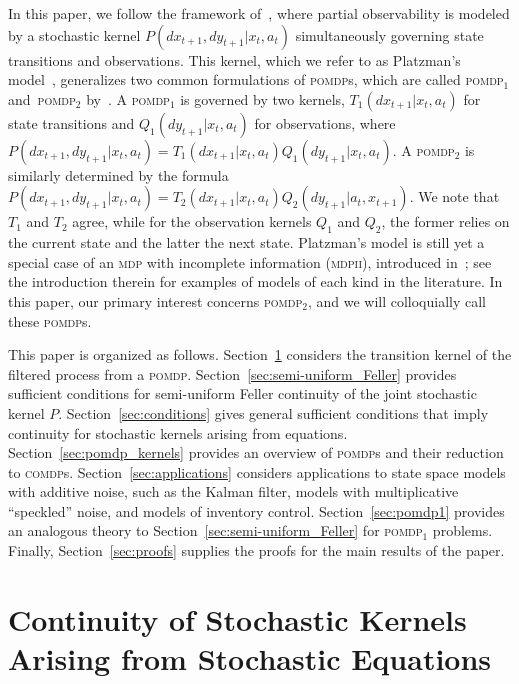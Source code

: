 \documentclass[11pt,onecolumn]{IEEEtran}  %
\newcommand{\mdp}{\textsc{mdp}}
\newcommand{\mdpii}{\textsc{mdpii}}
\newcommand{\pomdp}{\textsc{pomdp}}
\newcommand{\pomdpOne}{\pomdp{}${}_{1}$}
\newcommand{\pomdpTwo}{\pomdp{}${}_{2}$}
\newcommand{\comdp}{\textsc{comdp}}
\theoremstyle{definition}
\begin{document}
In this paper, we follow the framework of~\citet{feinberg_markov_2022}, where partial observability is modeled by a stochastic kernel $P(dx_{t+1}, dy_{t+1}|x_t,a_t)$ simultaneously governing state transitions and observations. This kernel, which we refer to as Platzman's model~\cite{platzman_1980}, generalizes two common formulations of \pomdp{}s, which are called \pomdpOne{} and~\pomdpTwo{} by~\citet{feinberg_markov_2022}. A \pomdpOne{} is governed by two kernels, $T_1(dx_{t+1}|x_t,a_t)$ for state transitions and $Q_1(dy_{t+1}|x_t,a_t)$ for observations, where $P(dx_{t+1},dy_{t+1}|x_t,a_t) = T_1(dx_{t+1}|x_t,a_t)Q_1(dy_{t+1}|x_t,a_t)$. A \pomdpTwo{} is similarly determined by the formula $P(dx_{t+1}, dy_{t+1} | x_t,a_t) = T_2(dx_{t+1}|x_t,a_t)Q_2(dy_{t+1}|a_t,x_{t+1})$. We note that $T_1$ and $T_2$ agree, while for the observation kernels $Q_1$ and $Q_2$, the former relies on the current state and the latter the next state. Platzman's model is still yet a special case of an \mdp{} with incomplete information (\mdpii{}), introduced in~\citet{feinberg_markov_2022}; see the introduction therein for examples of models of each kind in the literature. In this paper, our primary interest concerns \pomdpTwo{}, and we will colloquially call these \pomdp{}s.

This paper is organized as follows. Section~\ref{sec:continuity_of_stochastic_kernels} considers the transition kernel of the filtered process from a \pomdp{}. Section~\ref{sec:semi-uniform_Feller} provides sufficient conditions for semi-uniform Feller continuity of the joint stochastic kernel $P$. Section~\ref{sec:conditions} gives general sufficient conditions that imply continuity for stochastic kernels arising from equations. Section~\ref{sec:pomdp_kernels} provides an overview of \pomdp{}s and their reduction to \comdp{}s.  Section~\ref{sec:applications} considers applications to state space models with additive noise, such as the Kalman filter, models with multiplicative ``speckled'' noise, and models of inventory control. Section~\ref{sec:pomdp1} provides an analogous theory to Section~\ref{sec:semi-uniform_Feller} for \pomdpOne{} problems. Finally, Section~\ref{sec:proofs} supplies the proofs for the main results of the paper. 


\section{Continuity of Stochastic Kernels Arising from Stochastic Equations} \label{sec:continuity_of_stochastic_kernels}
\end{document}
